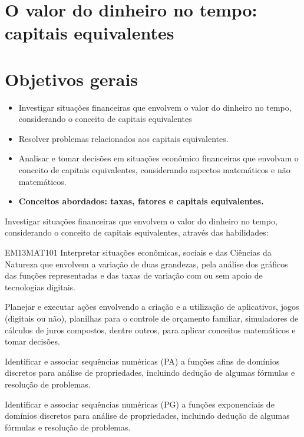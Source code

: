 \begin{paginatexto}

\section*{O valor do dinheiro no tempo: capitais equivalentes}

\section*{Objetivos gerais}

\begin{itemize}
\item Investigar situações financeiras que envolvem o valor do dinheiro no tempo, considerando o conceito de capitais equivalentes 
\item Resolver problemas relacionados aos capitais equivalentes.
\item Analisar e tomar decisões em situações econômico financeiras que envolvam o conceito de capitais equivalentes, considerando aspectos matemáticos e não matemáticos.

\item \textbf{Conceitos abordados: taxas, fatores e capitais equivalentes.}
\end{itemize}


Investigar situações financeiras que envolvem o valor do dinheiro no tempo, considerando o conceito de capitais equivalentes, através das habilidades:

\begin{habilities}{EM13MAT101}
 Interpretar situações econômicas, sociais e das Ciências da Natureza
que envolvem a variação de duas grandezas, pela análise dos gráficos das funções representadas e das taxas de variação com ou sem apoio de tecnologias digitais.

Planejar e executar ações envolvendo a criação e a utilização de aplicativos, jogos (digitais ou não), planilhas para o controle de orçamento familiar, simuladores de cálculos de juros compostos, dentre outros, para aplicar conceitos matemáticos e tomar decisões. 

Identificar e associar sequências numéricas (PA) a funções afins de domínios discretos para análise de propriedades, incluindo dedução de algumas fórmulas e resolução de problemas.

Identificar e associar sequências numéricas (PG) a funções exponenciais de domínios discretos para análise de propriedades, incluindo dedução de algumas fórmulas e resolução de problemas.
\end{habilities}


\end{paginatexto}
